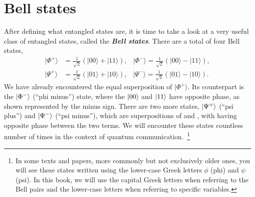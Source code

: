 \section{Bell states}
\label{sec:4_3-bell_states}

After defining what entangled states are, it is time to take a look at a very useful class of entangled states, called the \textbf{\emph{Bell states}}.
There are a total of four Bell states, 
\begin{equation}
    \begin{aligned}
        |\Phi^+\rangle & = \frac{1}{\sqrt{2}} \left( |00\rangle + |11\rangle \right), & 
        |\Phi^-\rangle = \frac{1}{\sqrt2} \left( |00\rangle - |11\rangle \right), \\
        |\Psi^+\rangle & = \frac{1}{\sqrt{2}} \left( |01\rangle + |10\rangle \right), & 
        |\Psi^-\rangle = \frac{1}{\sqrt2} \left(|01\rangle - |10\rangle \right).
    \end{aligned}
\end{equation}
We have already encountered the equal superposition of $|\Phi^+\rangle$.
Its counterpart is the $\left| \Phi^- \right\rangle$ (``phi minus'') state, where the $\left| 00 \right\rangle$ and $\left| 11 \right\rangle$ have opposite phase, as shown represented by the minus sign.
There are two more states, $\left| \Psi^+ \right\rangle$ (``psi plus'') and $\left| \Psi^- \right\rangle$ (``psi minus''), which are superpositions of  and , with \ket{\Psi^-} having opposite phase between the two terms. 
We will encounter these states countless number of times in the context of quantum communication.~\footnote{In some texts and papers, more commonly but not exclusively older ones, you will see these states written using the lower-case Greek letters $\phi$ (phi) and $\psi$ (psi).  In this book, we will use the capital Greek letters when referring to the Bell pairs and the lower-case letters when referring to specific variables.} 

